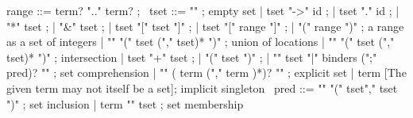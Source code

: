 \begin{syntax}
  range ::= term? ".." term? ;
       \
  tset ::= "\empty" ; empty set
       | tset "->" id ;
       | tset "." id ;
       | "*" tset ;
       | "&" tset ;
       | tset "[" tset "]" ;
       | tset "[" range "]" ;
       | "(" range ")" ; a range as a set of integers
       | "\union" "(" tset ("," tset)* ")" ; union of locations
       | "\inter" "(" tset ("," tset)* ")" ; intersection
       | tset "+" tset ;
       | "(" tset ")" ;
       | "{" tset "|" binders (";" pred)? "}" ; set comprehension
       | "{" ( term ("," term )*)? "}" ; explicit set
       | term [The given term may not itself be a set]; implicit singleton
       \
  pred ::= "\subset" "(" tset"," tset ")" ; set inclusion
       | term "\in" tset ; set membership
\end{syntax}

